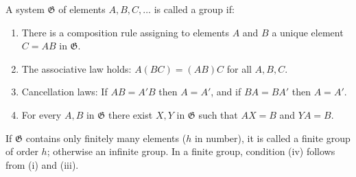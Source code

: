 A system $\mathfrak{G}$ of elements $A, B, C, \ldots$ is called a group if:
\begin{enumerate}
\item[(i)] There is a composition rule assigning to elements $A$ and $B$ a unique element $C = AB$ in $\mathfrak{G}$.
\item[(ii)] The associative law holds: $A(BC) = (AB)C$ for all $A, B, C$.
\item[(iii)] Cancellation laws: If $AB = A'B$ then $A = A'$, and if $BA = BA'$ then $A = A'$.
\item[(iv)] For every $A, B$ in $\mathfrak{G}$ there exist $X, Y$ in $\mathfrak{G}$ such that $AX = B$ and $YA = B$.
\end{enumerate}
If $\mathfrak{G}$ contains only finitely many elements ($h$ in number), it is called a finite group of order $h$; otherwise an infinite group. In a finite group, condition (iv) follows from (i) and (iii).
